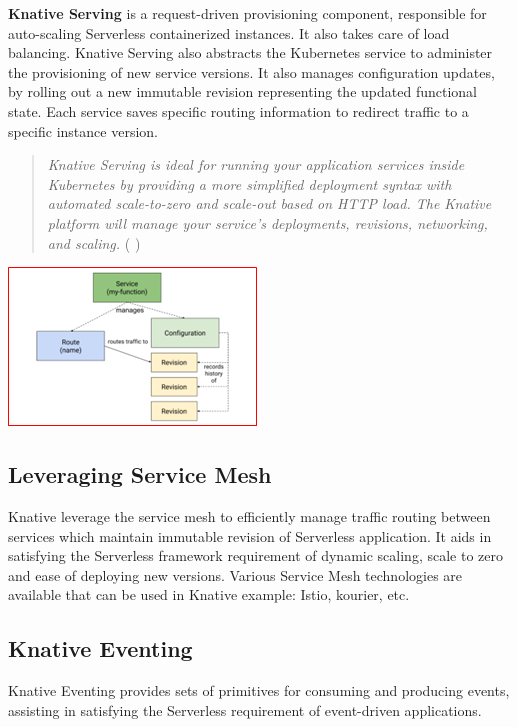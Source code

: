 \documentclass{article}
\begin{document}
\begin{flushleft}
\textbf{Knative Serving} is a request-driven provisioning component, responsible for auto-scaling Serverless containerized instances. It also takes care of load balancing. 
Knative Serving also abstracts the Kubernetes service to administer the provisioning of new service versions. It also manages configuration updates, by rolling out a new immutable revision representing the updated functional state. Each service saves specific routing information to redirect traffic to a specific instance version.
\begin{quote}
   \textit{Knative Serving is ideal for running your application services inside Kubernetes by providing a more simplified deployment syntax with automated scale-to-zero and scale-out based on \gls{HTTP} load. The Knative platform will manage your service’s deployments, revisions, networking, and scaling.} ( \cite{Sutter_Sampath_2020} )
\end{quote}
\par
\includegraphics[]{images/knative-serving.png}

\subsection{Leveraging Service Mesh}
Knative leverage the service mesh to efficiently manage traffic routing between services which maintain immutable revision of Serverless application. It aids in satisfying the Serverless framework requirement of dynamic scaling, scale to zero and ease of deploying new versions. Various Service Mesh technologies are available that can be used in Knative example: Istio, kourier, etc.

\subsection{Knative Eventing}
Knative Eventing provides sets of primitives for consuming and producing events, assisting in satisfying the Serverless requirement of event-driven applications. 


\end{flushleft}
\end{document}
